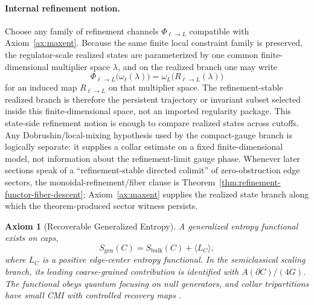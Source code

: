 \documentclass[11pt]{article}
\newtheorem{axiom}[theorem]{Axiom}
\begin{document}
\paragraph{Internal refinement notion.}
Choose any family of refinement channels \(\Phi_{\ell\to L}\) compatible with Axiom~\ref{ax:maxent}. Because the same finite local constraint family is preserved, the regulator-scale realized states are parameterized by one common finite-dimensional multiplier space \(\lambda\), and on the realized branch one may write
\[
\Phi_{\ell\to L}\bigl(\omega_{\ell}(\lambda)\bigr)
=
\omega_{L}\!\bigl(R_{\ell\to L}(\lambda)\bigr)
\]
for an induced map \(R_{\ell\to L}\) on that multiplier space. The refinement-stable realized branch is therefore the persistent trajectory or invariant subset selected inside this finite-dimensional space, not an imported regularity package. This state-side refinement notion is enough to compare realized states across cutoffs. Any Dobrushin/local-mixing hypothesis used by the compact-gauge branch is logically separate: it supplies a collar estimate on a fixed finite-dimensional model, not information about the refinement-limit gauge phase. Whenever later sections speak of a ``refinement-stable directed colimit'' of zero-obstruction edge sectors, the monoidal-refinement/fiber clause is Theorem~\ref{thm:refinement-functor-fiber-descent}; Axiom~\ref{ax:maxent} supplies the realized state branch along which the theorem-produced sector witness persists.

\begin{axiom}[Recoverable Generalized Entropy]\label{ax:entropy}
A generalized entropy functional exists on caps,
\[
S_{\mathrm{gen}}(C)=S_{\mathrm{bulk}}(C)+\langle L_C\rangle,
\]
where \(L_C\) is a positive edge-center entropy functional. In the semiclassical scaling branch, its leading coarse-grained contribution is identified with \(A(\partial C)/(4G)\). The functional obeys quantum focusing on null generators, and collar tripartitions have small CMI with controlled recovery maps \cite{liebRuskai73,petz86,petz88,fawziRenner15}.
\end{axiom}
\end{document}
